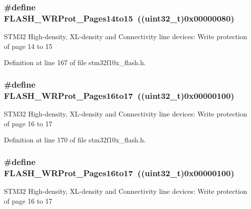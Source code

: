 \subsubsection[{\texorpdfstring{F\+L\+A\+S\+H\+\_\+\+W\+R\+Prot\+\_\+\+Pages14to15}{FLASH_WRProt_Pages14to15}}]{\setlength{\rightskip}{0pt plus 5cm}\#define F\+L\+A\+S\+H\+\_\+\+W\+R\+Prot\+\_\+\+Pages14to15~(({\bf uint32\+\_\+t})0x00000080)}\hypertarget{group___option___bytes___write___protection_ga5e5fcead35c861e1329c3e4e7e3ffa4e}{}\label{group___option___bytes___write___protection_ga5e5fcead35c861e1329c3e4e7e3ffa4e}
S\+T\+M32 High-\/density, X\+L-\/density and Connectivity line devices\+: Write protection of page 14 to 15 

Definition at line 167 of file stm32f10x\+\_\+flash.\+h.

\subsubsection[{\texorpdfstring{F\+L\+A\+S\+H\+\_\+\+W\+R\+Prot\+\_\+\+Pages16to17}{FLASH_WRProt_Pages16to17}}]{\setlength{\rightskip}{0pt plus 5cm}\#define F\+L\+A\+S\+H\+\_\+\+W\+R\+Prot\+\_\+\+Pages16to17~(({\bf uint32\+\_\+t})0x00000100)}\hypertarget{group___option___bytes___write___protection_ga33deabc2c4a82cfa4a98008082e29ea7}{}\label{group___option___bytes___write___protection_ga33deabc2c4a82cfa4a98008082e29ea7}
S\+T\+M32 High-\/density, X\+L-\/density and Connectivity line devices\+: Write protection of page 16 to 17 

Definition at line 170 of file stm32f10x\+\_\+flash.\+h.

\subsubsection[{\texorpdfstring{F\+L\+A\+S\+H\+\_\+\+W\+R\+Prot\+\_\+\+Pages16to17}{FLASH_WRProt_Pages16to17}}]{\setlength{\rightskip}{0pt plus 5cm}\#define F\+L\+A\+S\+H\+\_\+\+W\+R\+Prot\+\_\+\+Pages16to17~(({\bf uint32\+\_\+t})0x00000100)}\hypertarget{group___option___bytes___write___protection_ga33deabc2c4a82cfa4a98008082e29ea7}{}\label{group___option___bytes___write___protection_ga33deabc2c4a82cfa4a98008082e29ea7}
S\+T\+M32 High-\/density, X\+L-\/density and Connectivity line devices\+: Write protection of page 16 to 17 

